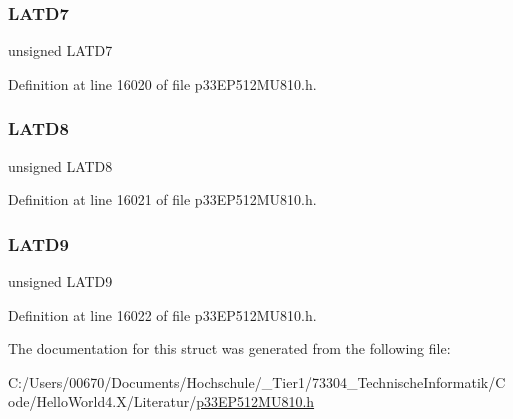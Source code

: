 \subsubsection{\texorpdfstring{L\+A\+T\+D7}{LATD7}}
{\footnotesize\ttfamily unsigned L\+A\+T\+D7}



Definition at line 16020 of file p33\+E\+P512\+M\+U810.\+h.

\mbox{\label{structtag_l_a_t_d_b_i_t_s_ab7e504cbf4761d1908eac20811bad7d7}} 
\subsubsection{\texorpdfstring{L\+A\+T\+D8}{LATD8}}
{\footnotesize\ttfamily unsigned L\+A\+T\+D8}



Definition at line 16021 of file p33\+E\+P512\+M\+U810.\+h.

\mbox{\label{structtag_l_a_t_d_b_i_t_s_a68dcb496990abb2e8c4a445505ef899b}} 
\subsubsection{\texorpdfstring{L\+A\+T\+D9}{LATD9}}
{\footnotesize\ttfamily unsigned L\+A\+T\+D9}



Definition at line 16022 of file p33\+E\+P512\+M\+U810.\+h.



The documentation for this struct was generated from the following file\+:\begin{DoxyCompactItemize}
\item 
C\+:/\+Users/00670/\+Documents/\+Hochschule/\+\_\+\+Tier1/73304\+\_\+\+Technische\+Informatik/\+Code/\+Hello\+World4.\+X/\+Literatur/\hyperlink{p33_e_p512_m_u810_8h}{p33\+E\+P512\+M\+U810.\+h}\end{DoxyCompactItemize}
